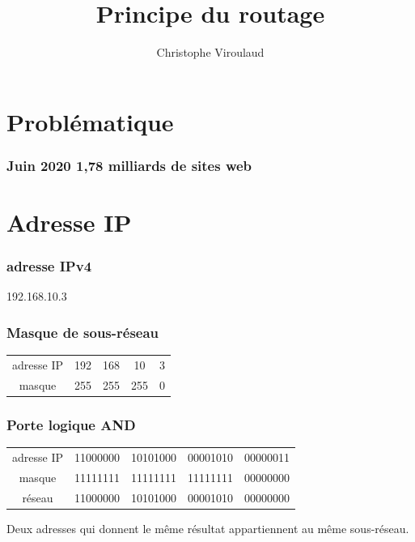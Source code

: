\documentclass[svgnames,11pt]{beamer}
\author[]{Christophe Viroulaud}
\title{Principe du routage}
\date{}
\institute{Terminale NSI}
\begin{document}
\begin{frame}
\titlepage
\end{frame}

\section{Problématique}
\begin{frame}
    \frametitle{Juin 2020 1,78 milliards de sites web}

    
\begin{center}
\end{center}

\end{frame}

\section{Adresse IP}
\begin{frame}
    \frametitle{adresse IPv4}

    \begin{center}
        \large{192.168.10.3}
    \end{center}

\end{frame}
\begin{frame}
    \frametitle{Masque de sous-réseau}

    \begin{center}
        \begin{tabular}{ccccc}
            adresse IP & 192 & 168 & 10  & 3 \\
            masque     & 255 & 255 & 255 & 0 \\
        \end{tabular}
    \end{center}

\end{frame}

\begin{frame}
    \frametitle{Porte logique AND}

    \begin{center}
        \begin{tabular}{ccccc}
            adresse IP & 11000000 & 10101000 & 00001010 & 00000011 \\
            masque     & 11111111 & 11111111 & 11111111 & 00000000 \\
            réseau     & 11000000 & 10101000 & 00001010 & 00000000 \\
        \end{tabular}
    \end{center}

    Deux adresses qui donnent le même résultat appartiennent au même sous-réseau.
\end{frame}
\end{document}
